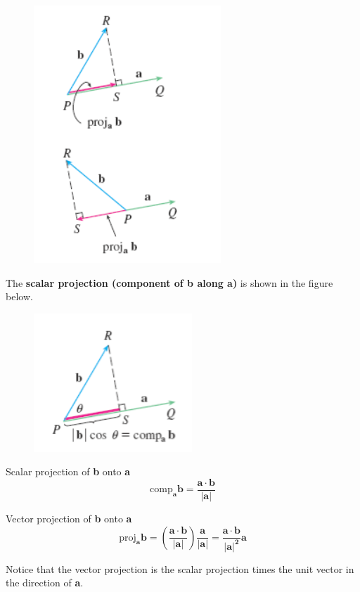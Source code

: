         \begin{figure}[hbt!]
            \centering
            \includegraphics[scale = 0.75]{Resources/12.3_Projections}
        \end{figure}

        The \textbf{scalar projection (component of b along a)} is shown in the figure below.

        \begin{figure}[hbt!]
            \centering
            \includegraphics[]{Resources/12.3_Scalar_Projection}
        \end{figure}

        \begin{theorem}{Scalar projection of \textbf{b} onto \textbf{a}}
            \[
                \text{comp}_{\mathbf{a}} \mathbf{b = \frac{a\cdot b}{|a|}}
            \]
        \end{theorem}

        \begin{theorem}{Vector projection of \textbf{b} onto \textbf{a}}
            \[
                \text{proj}_{\mathbf{a}} \mathbf{b = \left(\frac{a\cdot b}{|a|}\right)\frac{a}{|a|} = \frac{a\cdot b}{|a|^2}a}
            \]

            Notice that the vector projection is the scalar projection times the unit vector in the direction of \textbf{a}.
        \end{theorem}

